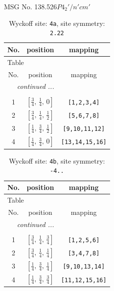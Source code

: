 \documentclass[fleqn,8pt]{jsarticle}
\begin{document}
\setcounter{MaxMatrixCols}{32}

\renewcommand{\tablename}{Table~}
\renewcommand{\figurename}{Figure~}
\begin{center}
\LARGE
MSG No. 138.526\quad$P4_{2}'/n'cm'$
\end{center}
\renewcommand{\arraystretch}{1.2}
\begin{longtable}{ccc}
\caption{Wyckoff site: {\tt 4a}, site symmetry: {\tt 2.22}}
 \\
 \hline \hline
No. & position & mapping \\ \hline \endfirsthead

\multicolumn{2}{l}{\tablename\ \thetable{}} \\
 \hline \hline
No. & position & mapping \\ \hline \endhead

 \hline \hline
\multicolumn{2}{r}{\footnotesize\it continued ...} \\ \endfoot

 \hline \hline
\multicolumn{2}{r}{} \\ \endlastfoot

1 & $\left[ \frac{3}{4},\, \frac{1}{4},\, 0 \right]$ & {\tt [1,2,3,4]} \\ \hline
2 & $\left[ \frac{3}{4},\, \frac{1}{4},\, \frac{1}{2} \right]$ & {\tt [5,6,7,8]} \\ \hline
3 & $\left[ \frac{1}{4},\, \frac{3}{4},\, \frac{1}{2} \right]$ & {\tt [9,10,11,12]} \\ \hline
4 & $\left[ \frac{1}{4},\, \frac{3}{4},\, 0 \right]$ & {\tt [13,14,15,16]} \\
\end{longtable}
\renewcommand{\arraystretch}{1.2}
\begin{longtable}{ccc}
\caption{Wyckoff site: {\tt 4b}, site symmetry: {\tt -4..}}
 \\
 \hline \hline
No. & position & mapping \\ \hline \endfirsthead

\multicolumn{2}{l}{\tablename\ \thetable{}} \\
 \hline \hline
No. & position & mapping \\ \hline \endhead

 \hline \hline
\multicolumn{2}{r}{\footnotesize\it continued ...} \\ \endfoot

 \hline \hline
\multicolumn{2}{r}{} \\ \endlastfoot

1 & $\left[ \frac{3}{4},\, \frac{1}{4},\, \frac{3}{4} \right]$ & {\tt [1,2,5,6]} \\ \hline
2 & $\left[ \frac{3}{4},\, \frac{1}{4},\, \frac{1}{4} \right]$ & {\tt [3,4,7,8]} \\ \hline
3 & $\left[ \frac{1}{4},\, \frac{3}{4},\, \frac{1}{4} \right]$ & {\tt [9,10,13,14]} \\ \hline
4 & $\left[ \frac{1}{4},\, \frac{3}{4},\, \frac{3}{4} \right]$ & {\tt [11,12,15,16]} \\
\end{longtable}
\end{document}
